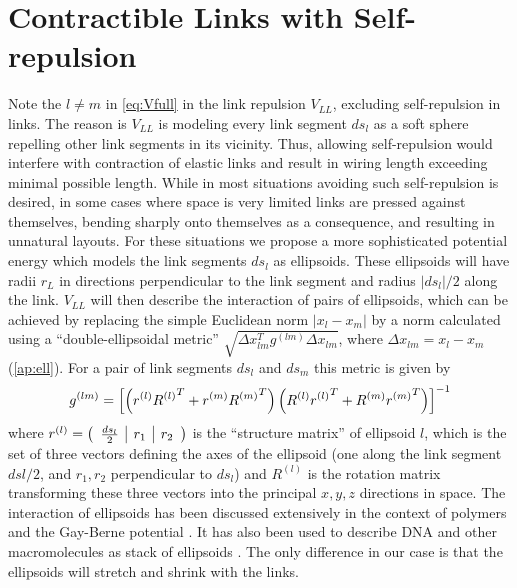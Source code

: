 \documentclass[nofootinbib,preprint,floatfix,titlepage,superscriptaddress]{revtex4} %
\begin{document}
\section{Contractible Links with Self-repulsion\label{ap:ell}}
Note the $l\ne m $ in \eqref{eq:Vfull} in the link repulsion $V_{LL}$, excluding self-repulsion in links. 
The reason is $V_{LL}$ is modeling every link segment $ds_l$ as a soft sphere repelling other link segments in its vicinity.
Thus, allowing self-repulsion would interfere with contraction of elastic links and result in wiring length exceeding minimal possible length. 
While in most situations avoiding such self-repulsion is desired, in some cases where space is very limited links are pressed against themselves, bending sharply onto themselves as a consequence, and resulting in unnatural layouts. 
For these situations we propose a more sophisticated potential energy which models the link segments $ds_l$ as ellipsoids. 
These ellipsoids will have radii $r_L$ in directions perpendicular to the link segment and radius $|ds_l|/2$ along the link. 
$V_{LL}$ will then describe the interaction of pairs of ellipsoids, which can be achieved by replacing the simple Euclidean norm $|x_l-x_m|%
$ by a norm calculated using a ``double-ellipsoidal metric'' $\sqrt{\Delta x_{lm}^Tg^{(lm)}\Delta x_{lm}}$, where $\Delta x_{lm} = x_l-x_m$ (\ref{ap:ell}). 
For a pair of link segments $ds_l$ and $ds_m$ this metric is given by 
\begin{align}
    g^{(lm)} = \left[\left(r^{(l)}{R^{(l)}}^T+ r^{(m)}{R^{(m)}}^T\right) \left(R^{(l)}{r^{(l)}}^T+ R^{(m)}{r^{(m)}}^T\right) \right]^{-1}
    \label{eq:g-ell}
\end{align}
where $r^{(l)} = \left(\begin{array}{c|c|c}{ds_l\over2} & r_{1} &r_{2}\end{array}
    \right)$ 
is the ``structure matrix'' of ellipsoid $l$, which is the set of three vectors defining the axes of the ellipsoid (one along the link segment $dsl/2$, and $r_1, r_2$ perpendicular to $ds_l$) and $R^{(l)}$ is the rotation matrix transforming these three vectors into the principal $x,y,z$ directions in space. 
The interaction of ellipsoids has been discussed extensively in the context of polymers and the Gay-Berne potential \citep{gay1981modification,berne1972gaussian,everaers2003interaction}. 
It has also been used to describe DNA and other macromolecules as stack of ellipsoids \citep{babadi2006coarse,mergell2003modeling,cleaver1996extension}.
The only difference in our case is that the ellipsoids will stretch and shrink with the links. 
\end{document}
